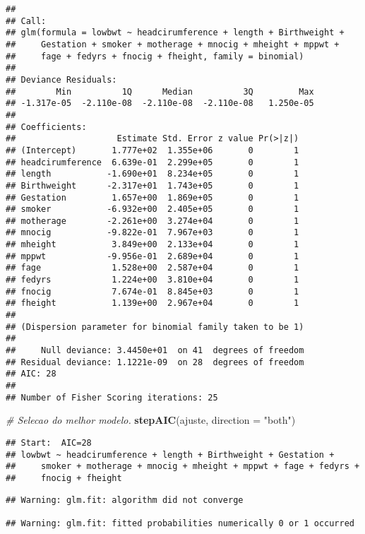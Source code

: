 \documentclass[]{article}
\newenvironment{Shaded}{\begin{snugshade}}{\end{snugshade}}
\newcommand{\CommentTok}[1]{\textcolor[rgb]{0.56,0.35,0.01}{\textit{#1}}}
\newcommand{\DataTypeTok}[1]{\textcolor[rgb]{0.13,0.29,0.53}{#1}}
\newcommand{\KeywordTok}[1]{\textcolor[rgb]{0.13,0.29,0.53}{\textbf{#1}}}
\newcommand{\NormalTok}[1]{#1}
\newcommand{\StringTok}[1]{\textcolor[rgb]{0.31,0.60,0.02}{#1}}
\begin{document}
\begin{verbatim}
## 
## Call:
## glm(formula = lowbwt ~ headcirumference + length + Birthweight + 
##     Gestation + smoker + motherage + mnocig + mheight + mppwt + 
##     fage + fedyrs + fnocig + fheight, family = binomial)
## 
## Deviance Residuals: 
##        Min          1Q      Median          3Q         Max  
## -1.317e-05  -2.110e-08  -2.110e-08  -2.110e-08   1.250e-05  
## 
## Coefficients:
##                    Estimate Std. Error z value Pr(>|z|)
## (Intercept)       1.777e+02  1.355e+06       0        1
## headcirumference  6.639e-01  2.299e+05       0        1
## length           -1.690e+01  8.234e+05       0        1
## Birthweight      -2.317e+01  1.743e+05       0        1
## Gestation         1.657e+00  1.869e+05       0        1
## smoker           -6.932e+00  2.405e+05       0        1
## motherage        -2.261e+00  3.274e+04       0        1
## mnocig           -9.822e-01  7.967e+03       0        1
## mheight           3.849e+00  2.133e+04       0        1
## mppwt            -9.956e-01  2.689e+04       0        1
## fage              1.528e+00  2.587e+04       0        1
## fedyrs            1.224e+00  3.810e+04       0        1
## fnocig            7.674e-01  8.845e+03       0        1
## fheight           1.139e+00  2.967e+04       0        1
## 
## (Dispersion parameter for binomial family taken to be 1)
## 
##     Null deviance: 3.4450e+01  on 41  degrees of freedom
## Residual deviance: 1.1221e-09  on 28  degrees of freedom
## AIC: 28
## 
## Number of Fisher Scoring iterations: 25
\end{verbatim}

\begin{Shaded}
\begin{Highlighting}[]
\CommentTok{# Selecao do melhor modelo.}
\KeywordTok{stepAIC}\NormalTok{(ajuste, }\DataTypeTok{direction =} \StringTok{"both"}\NormalTok{)}
\end{Highlighting}
\end{Shaded}

\begin{verbatim}
## Start:  AIC=28
## lowbwt ~ headcirumference + length + Birthweight + Gestation + 
##     smoker + motherage + mnocig + mheight + mppwt + fage + fedyrs + 
##     fnocig + fheight
\end{verbatim}

\begin{verbatim}
## Warning: glm.fit: algorithm did not converge

## Warning: glm.fit: fitted probabilities numerically 0 or 1 occurred
\end{verbatim}
\end{document}
